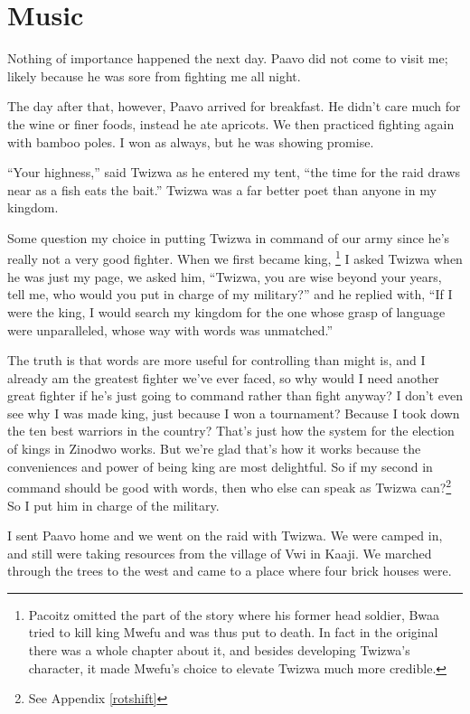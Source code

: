 \chapter{Music}

Nothing of importance happened the next day. Paavo did not come to visit me; likely because he was sore from fighting me all night.

The day after that, however, Paavo arrived for breakfast. He didn't care much for the wine or finer foods, instead he ate apricots. We then practiced fighting again with bamboo poles. I won as always, but he was showing promise.

``Your highness,'' said Twizwa as he entered my tent, ``the time for the raid draws near as a fish eats the bait.'' Twizwa was a far better poet than anyone in my kingdom.

Some question my choice in putting Twizwa in command of our army since he's really not a very good fighter. When we first became king,
\footnote{Pacoitz omitted the part of the story where his former head soldier, Bwaa tried to kill king Mwefu and was thus put to death. In fact in the original there was a whole chapter about it, and besides developing Twizwa's character, it made Mwefu's choice to elevate Twizwa much more credible.}
I asked Twizwa when he was just my page, we asked him, ``Twizwa, you are wise beyond your years, tell me, who would you put in charge of my military?'' and he replied with, ``If I were the king, I would search my kingdom for the one whose grasp of language were unparalleled, whose way with words was unmatched.''

The truth is that words are more useful for controlling than might is, and I already am the greatest fighter we've ever faced, so why would I need another great fighter if he's just going to command rather than fight anyway? I don't even see why I was made king, just because I won a tournament? Because I took down the ten best warriors in the country? That's just how the system for the election of kings in Zinodwo works. But we're glad that's how it works because the conveniences and power of being king are most delightful.
So if my second in command should be good with words, then who else can speak as Twizwa can?\footnote{See Appendix \ref{rotshift}} So I put him in charge of the military.

I sent Paavo home and we went on the raid with Twizwa. We were camped in, and still were taking resources from the village of Vwi in Kaaji. We marched through the trees to the west and came to a place where four brick houses were.

